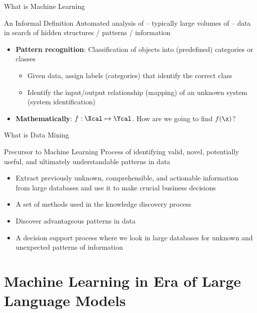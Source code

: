 \documentclass[aspectratio=169,xcolor=dvipsnames,svgnames,x11names,fleqn]{beamer}
\begin{document}
\begin{frame}{What is Machine Learning}
\begin{tblock}{An Informal Definition}
Automated analysis of – typically large volumes of – data in search of hidden structures / patterns / information
\begin{itemize}
    \item<2-> {\bf\color{DarkBlue} Pattern recognition}: Classification of objects into (predefined) categories or classes 
    \begin{itemize}
        \item Given data, assign labels (categories) that identify the correct class 
        \item Identify the input/output relationship (mapping) of an unknown system (system identification) 
    \end{itemize}
    \item<3-> {\bf\color{DarkBlue} Mathematically}: $f: \Xcal \mapsto \Ycal$. How are we going to find $f(\x)$?
\end{itemize}
\end{tblock}
\end{frame}


\begin{frame}{What is Data Mining}
\begin{tblock}{Precursor to Machine Learning}
Process of identifying valid, novel, potentially useful, and ultimately understandable patterns in data
\begin{itemize}
    \item<2-> Extract previously unknown, comprehensible, and actionable information from large databases and use it to make crucial business decisions
    \item<3-> A set of methods used in the knowledge discovery process
    \item<4-> Discover advantageous patterns in data
    \item<5-> A decision support process where we look in large databases
for unknown and unexpected patterns of information
\end{itemize}
\end{tblock}
\end{frame}


\section{Machine Learning in Era of Large Language Models}
\end{document}
